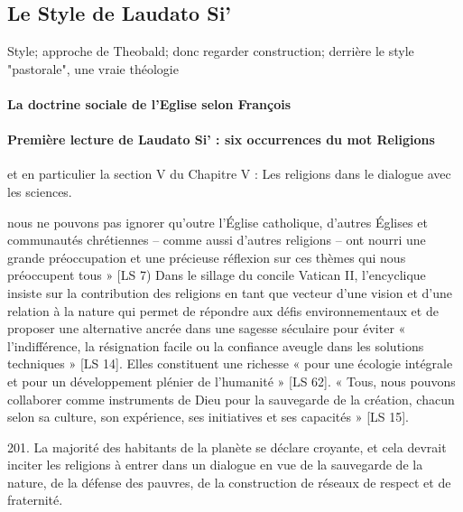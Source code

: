 \subsection{Le Style de Laudato Si’}  

Style; approche de Theobald; donc regarder construction; derrière le style "pastorale", une vraie théologie

\paragraph{La doctrine sociale de l'Eglise selon François} \cite{theobald_lenseignement_2016}

\cite{theobald_repenser_2019}

\paragraph{Première lecture de Laudato Si’ : six occurrences du mot Religions} et en particulier la section V du Chapitre V : Les religions dans le dialogue avec les sciences. \cite{francois_laudato_2015}
\begin{singlequote}
     nous ne pouvons pas ignorer qu’outre l’Église catholique, d’autres Églises et communautés chrétiennes – comme aussi d’autres religions – ont nourri une grande préoccupation et une précieuse réflexion sur ces thèmes qui nous préoccupent tous » [LS 7)
        Dans le sillage du concile Vatican II, l’encyclique insiste sur la contribution des religions en tant que vecteur d’une vision et d’une relation à la nature qui permet de répondre aux défis environnementaux et de proposer une alternative ancrée dans une sagesse séculaire pour éviter « l’indifférence, la résignation facile ou la confiance aveugle dans les solutions techniques » [LS 14]. Elles constituent une richesse « pour une écologie intégrale et pour un développement plénier de l’humanité » [LS 62].  « Tous, nous pouvons collaborer comme instruments de Dieu pour la sauvegarde de la création, chacun selon sa culture, son expérience, ses initiatives et ses capacités » [LS 15].  \cite{francois_laudato_2015}
\end{singlequote}
\begin{singlequote}
    201. La majorité des habitants de la planète se déclare croyante, et cela devrait inciter les religions à entrer dans un dialogue en vue de la sauvegarde de
la nature, de la défense des pauvres, de la construction de réseaux de respect
et de fraternité. 
\end{singlequote}
 
